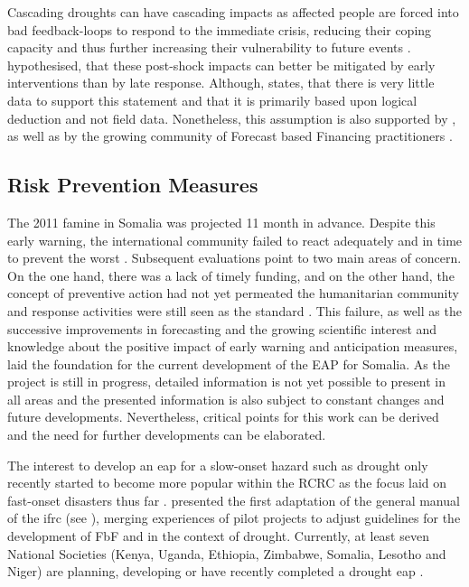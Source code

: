 Cascading droughts can have cascading impacts as affected people are forced into bad feedback-loops to respond to the immediate crisis, reducing their coping capacity and thus further increasing their vulnerability to future events \autocite{usaidEconomicsResilienceDrought2018}. \Textcite{usaidEconomicsResilienceDrought2018} hypothesised, that these post-shock impacts can better be mitigated by early interventions than by late response. Although, \autocite{usaidEconomicsResilienceDrought2018} states, that there is very little data to support this statement and that it is primarily based upon logical deduction and not field data. Nonetheless, this assumption is also supported by \textcite{aliMitigatingNaturalDisasters2017a}, \textcite{abdulkadirAssessmentDroughtRecurrence2017} as well as by the growing community of Forecast based Financing practitioners \autocite{gualazziniEWEAEarlyWarning2021, harrowsmithFutureForecastImpact2020}.

\subsection{Risk Prevention Measures}\label{subsec:case_eap}

The 2011 famine in Somalia was projected 11 month in advance. Despite this early warning, the international community failed to react adequately and in time to prevent the worst \autocite{stephensFORECASTBASEDACTION2015, hillbrunerWhenEarlyWarning2012}. Subsequent evaluations point to two main areas of concern. On the one hand, there was a lack of timely funding, and on the other hand, the concept of preventive action had not yet permeated the humanitarian community and response activities were still seen as the standard \autocite{stephensFORECASTBASEDACTION2015}. This failure, as well as the successive improvements in forecasting and the growing scientific interest and knowledge about the positive impact of early warning and anticipation measures, laid the foundation for the current development of the EAP for Somalia. As the project is still in progress, detailed information is not yet possible to present in all areas and the presented information is also subject to constant changes and future developments. Nevertheless, critical points for this work can be derived and the need for further developments can be elaborated.

The interest to develop an \acrshort{eap} for a slow-onset hazard such as drought only recently started to become more popular within the RCRC as the focus laid on fast-onset disasters thus far \autocite{rcrcForecastbasedFinancingEarly2020}. \Textcite{rcrcForecastbasedFinancingEarly2020} presented the first adaptation of the general manual of the \acrshort{ifrc} (see \textcite{ifrcFbFPractitionersManual2023b}), merging experiences of pilot projects to adjust guidelines for the development of FbF and  in the context of drought. Currently, at least seven National Societies (Kenya, Uganda, Ethiopia, Zimbabwe, Somalia, Lesotho and Niger) are planning, developing or have recently completed a drought \acrshort{eap} \autocite{lesothoredcrosssocietyEarlyActionProtocol2022,nigerredcrosssocietyNigerDroughtEarly2021,rcrcForecastbasedFinancingEarly2020}.


